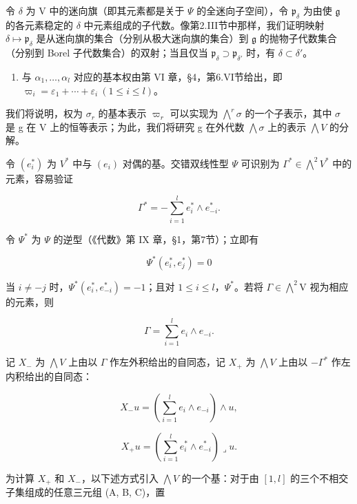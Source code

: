 令 \(\delta\) 为 V 中的迷向旗（即其元素都是关于 \(\varPsi\) 的全迷向子空间），令 \(\mathfrak{p}_{\delta}\) 为由使 \(\mathfrak{g}\) 的各元素稳定的 \(\delta\) 中元素组成的子代数。像第2.III节中那样，我们证明映射 \(\delta \mapsto \mathfrak{p}_{\delta}\) 是从迷向旗的集合（分别从极大迷向旗的集合）到 \(\mathfrak{g}\) 的抛物子代数集合（分别到 Borel 子代数集合）的双射；当且仅当 \(\mathfrak{p}_{\delta} \supset \mathfrak{p}_{\delta'}\) 时，有 \(\delta \subset \delta'\)。

\begin{enumerate}
\def\labelenumi{(\Roman{enumi})}
\setcounter{enumi}{3}
\tightlist
\item
与 \(\alpha_{1},\ldots,\alpha_{l}\) 对应的基本权由第 VI 章，§4，第6.VI节给出，即 \(\varpi_{i}=\varepsilon_{1}+\cdots+\varepsilon_{i}\ (1\leq i\leq l)\)。
\end{enumerate}

我们将说明，权为 \(\sigma_{r}\) 的基本表示 \(\varpi_{r}\) 可以实现为 \(\bigwedge^{r}\sigma\) 的一个子表示，其中 \(\sigma\) 是 g 在 V 上的恒等表示；为此，我们将研究 g 在外代数 \(\bigwedge\sigma\) 上的表示 \(\bigwedge V\) 的分解。

令 \((e_{i}^{*})\) 为 \(V^{*}\) 中与 \((e_{i})\) 对偶的基。交错双线性型 \(\varPsi\) 可识别为 \(\varGamma^{*}\in\bigwedge^{2}V^{*}\) 中的元素，容易验证

\[
\Gamma^ {*} = - \sum_ {i = 1} ^ {l} e _ {i} ^ {*} \wedge e _ {- i} ^ {*}.
\]

令 \(\varPsi^{*}\) 为 \(\varPsi\) 的逆型（《代数》第 IX 章，§1，第7节）；立即有

\[
\varPsi^ {*} (e _ {i} ^ {*}, e _ {j} ^ {*}) = 0
\]

当 \(i \neq -j\) 时，\(\Psi^{*}(e_{i}^{*}, e_{-i}^{*}) = -1\)；且对 \(1 \leq i \leq l\)，\(\Psi^{*}\)。若将 \(\Gamma \in \bigwedge^{2}\mathrm{V}\) 视为相应的元素，则

\[
\Gamma = \sum_ {i = 1} ^ {l} e _ {i} \wedge e _ {- i}.
\]

记 \(X_{-}\) 为 \(\bigwedge V\) 上由以 \(\Gamma\) 作左外积给出的自同态，记 \(X_{+}\) 为 \(\bigwedge V\) 上由以 \(-\Gamma^{*}\) 作左内积给出的自同态：

\[
X _ {-} u = \left(\sum_ {i = 1} ^ {l} e _ {i} \wedge e _ {- i}\right) \wedge u,
\]

\[
X _ {+} u = \left(\sum_ {i = 1} ^ {l} e _ {i} ^ {*} \wedge e _ {- i} ^ {*}\right) \lrcorner u.
\]

为计算 \(X_{+}\) 和 \(X_{-}\)，以下述方式引入 \(\bigwedge V\) 的一个基：对于由 \([1, l]\) 的三个不相交子集组成的任意三元组 (A, B, C)，置

